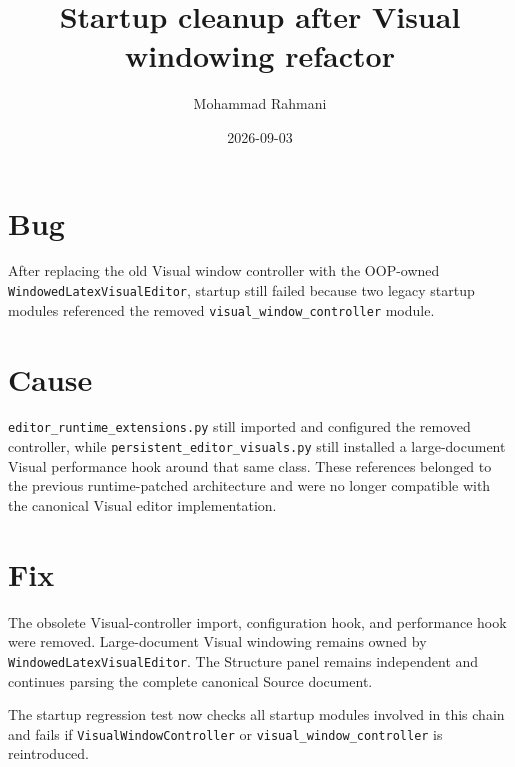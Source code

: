 \documentclass[a4paper]{article}
\title{Startup cleanup after Visual windowing refactor}
\date{2026-09-03}
\author{Mohammad Rahmani}
\begin{document}
\maketitle

\section{Bug}
After replacing the old Visual window controller with the OOP-owned
\texttt{WindowedLatexVisualEditor}, startup still failed because two legacy
startup modules referenced the removed
\texttt{visual\_window\_controller} module.

\section{Cause}
\texttt{editor\_runtime\_extensions.py} still imported and configured the
removed controller, while \texttt{persistent\_editor\_visuals.py} still
installed a large-document Visual performance hook around that same class.
These references belonged to the previous runtime-patched architecture and
were no longer compatible with the canonical Visual editor implementation.

\section{Fix}
The obsolete Visual-controller import, configuration hook, and performance
hook were removed. Large-document Visual windowing remains owned by
\texttt{WindowedLatexVisualEditor}. The Structure panel remains independent
and continues parsing the complete canonical Source document.

The startup regression test now checks all startup modules involved in this
chain and fails if \texttt{VisualWindowController} or
\texttt{visual\_window\_controller} is reintroduced.
\end{document}
